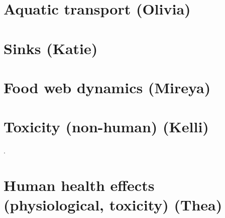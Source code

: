 \documentclass{article}\usepackage[]{graphicx}\usepackage[]{color}
\begin{document}
\section{Aquatic transport (Olivia)}

\section{Sinks (Katie)}\section{Food web dynamics (Mireya)}

\section{Toxicity (non-human) (Kelli)}

. 


\section{Human health effects (physiological, toxicity) (Thea)}

\end{document}
